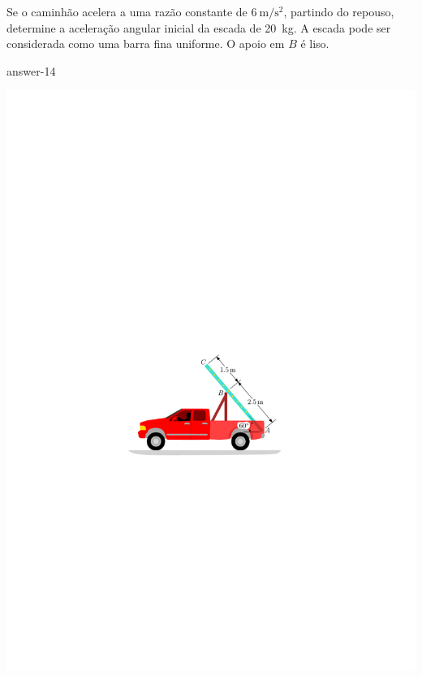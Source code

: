 \item Se o caminhão acelera a uma razão constante de $\SI{6}{\meter/\second^{2}}$, partindo do repouso, determine a aceleração angular inicial da escada de \SI{20}{\kilogram}. A escada pode ser considerada como uma barra fina uniforme. O apoio em $B$ é liso.

{answer-14}

\vspace{-1cm}
\begin{flushright}
	\includegraphics[scale=1.2]{../../images/draw_12}
\end{flushright}